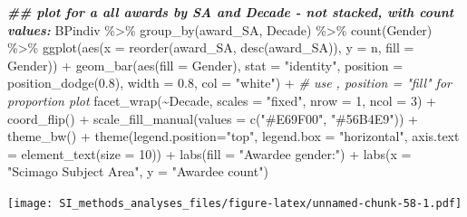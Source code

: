 \documentclass[
]{article}
\newenvironment{Shaded}{\begin{snugshade}}{\end{snugshade}}
\newcommand{\AttributeTok}[1]{\textcolor[rgb]{0.77,0.63,0.00}{#1}}
\newcommand{\CommentTok}[1]{\textcolor[rgb]{0.56,0.35,0.01}{\textit{#1}}}
\newcommand{\DecValTok}[1]{\textcolor[rgb]{0.00,0.00,0.81}{#1}}
\newcommand{\DocumentationTok}[1]{\textcolor[rgb]{0.56,0.35,0.01}{\textbf{\textit{#1}}}}
\newcommand{\FloatTok}[1]{\textcolor[rgb]{0.00,0.00,0.81}{#1}}
\newcommand{\FunctionTok}[1]{\textcolor[rgb]{0.00,0.00,0.00}{#1}}
\newcommand{\NormalTok}[1]{#1}
\newcommand{\SpecialCharTok}[1]{\textcolor[rgb]{0.00,0.00,0.00}{#1}}
\newcommand{\StringTok}[1]{\textcolor[rgb]{0.31,0.60,0.02}{#1}}
\begin{document}
\begin{Shaded}
\begin{Highlighting}[]
\DocumentationTok{\#\# plot for a all awards by SA and Decade {-} not stacked, with count values:}
\NormalTok{BPindiv }\SpecialCharTok{\%\textgreater{}\%} 
  \FunctionTok{group\_by}\NormalTok{(award\_SA, Decade) }\SpecialCharTok{\%\textgreater{}\%}
  \FunctionTok{count}\NormalTok{(Gender) }\SpecialCharTok{\%\textgreater{}\%}
  \FunctionTok{ggplot}\NormalTok{(}\FunctionTok{aes}\NormalTok{(}\AttributeTok{x =} \FunctionTok{reorder}\NormalTok{(award\_SA, }\FunctionTok{desc}\NormalTok{(award\_SA)), }\AttributeTok{y =}\NormalTok{ n, }\AttributeTok{fill =}\NormalTok{ Gender)) }\SpecialCharTok{+}
  \FunctionTok{geom\_bar}\NormalTok{(}\FunctionTok{aes}\NormalTok{(}\AttributeTok{fill =}\NormalTok{ Gender), }\AttributeTok{stat =} \StringTok{"identity"}\NormalTok{, }\AttributeTok{position =} \FunctionTok{position\_dodge}\NormalTok{(}\FloatTok{0.8}\NormalTok{), }\AttributeTok{width =} \FloatTok{0.8}\NormalTok{, }\AttributeTok{col =} \StringTok{"white"}\NormalTok{) }\SpecialCharTok{+} \CommentTok{\# use , position = "fill" for proportion plot}
  \FunctionTok{facet\_wrap}\NormalTok{(}\SpecialCharTok{\textasciitilde{}}\NormalTok{Decade, }\AttributeTok{scales =} \StringTok{"fixed"}\NormalTok{, }\AttributeTok{nrow =} \DecValTok{1}\NormalTok{, }\AttributeTok{ncol =} \DecValTok{3}\NormalTok{) }\SpecialCharTok{+}
  \FunctionTok{coord\_flip}\NormalTok{() }\SpecialCharTok{+} 
  \FunctionTok{scale\_fill\_manual}\NormalTok{(}\AttributeTok{values =} \FunctionTok{c}\NormalTok{(}\StringTok{"\#E69F00"}\NormalTok{, }\StringTok{"\#56B4E9"}\NormalTok{)) }\SpecialCharTok{+}
  \FunctionTok{theme\_bw}\NormalTok{() }\SpecialCharTok{+}
  \FunctionTok{theme}\NormalTok{(}\AttributeTok{legend.position=}\StringTok{"top"}\NormalTok{, }\AttributeTok{legend.box =} \StringTok{"horizontal"}\NormalTok{, }\AttributeTok{axis.text =} \FunctionTok{element\_text}\NormalTok{(}\AttributeTok{size =} \DecValTok{10}\NormalTok{)) }\SpecialCharTok{+}
  \FunctionTok{labs}\NormalTok{(}\AttributeTok{fill =} \StringTok{"Awardee gender:"}\NormalTok{) }\SpecialCharTok{+}
  \FunctionTok{labs}\NormalTok{(}\AttributeTok{x =} \StringTok{"Scimago Subject Area"}\NormalTok{, }\AttributeTok{y =} \StringTok{"Awardee count"}\NormalTok{)  }
\end{Highlighting}
\end{Shaded}

\texttt{[image: SI\_methods\_analyses\_files/figure-latex/unnamed-chunk-58-1.pdf]}
\end{document}

